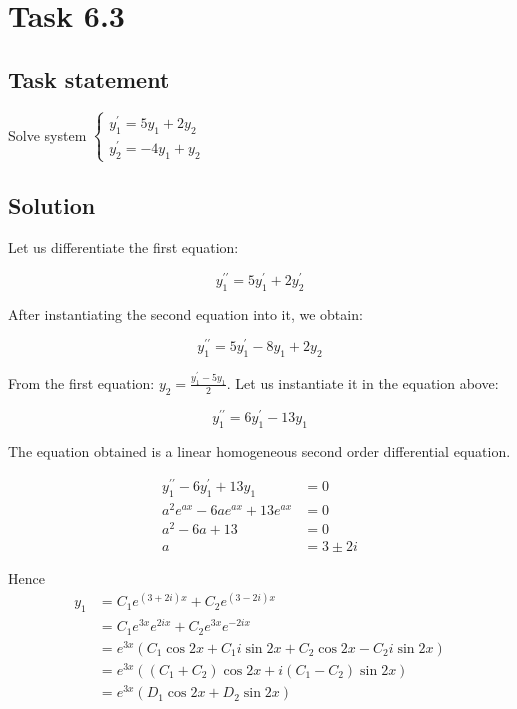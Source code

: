 \section*{Task 6.3}

\subsection*{Task statement}

Solve system $\begin{cases}
    y_1^{\prime} = 5y_1 + 2y_2 \\
    y_2^{\prime} = -4y_1 + y_2
\end{cases}$

\subsection*{Solution}

Let us differentiate the first equation:

\[y_1^{\prime \prime} = 5y_1^{\prime} + 2y_2^{\prime}\]

After instantiating the second equation into it, we obtain:

\[y_1^{\prime \prime} = 5y_1^{\prime} - 8y_1 + 2y_2\]

From the first equation: $y_2 = \frac{y_1^{\prime} - 5y_1}{2}$. Let us instantiate it in the equation above:

\[y_1^{\prime \prime} = 6y_1^{\prime} - 13y_1\]

The equation obtained is a linear homogeneous second order differential equation.

\begin{displaymath}
    \begin{aligned}
        y_1^{\prime \prime} - 6y_1^{\prime} + 13y_1 & = 0 \\ 
        a^2 e^{ax} - 6a e^{ax} + 13 e^{ax} & = 0 \\
        a^2 - 6a + 13 & = 0 \\
        a & = 3 \pm 2i
    \end{aligned}
\end{displaymath}

Hence 
\begin{displaymath}
    \begin{aligned}
        y_1 & = C_1 e^{(3 + 2i)x} + C_2 e^{(3 - 2i)x} \\
        & = C_1 e^{3x} e^{2ix} + C_2 e^{3x} e^{-2ix} \\
        & = e^{3x} (C_1 \cos{2x} + C_1 i \sin{2x} + C_2 \cos{2x} - C_2 i \sin{2x}) \\
        & = e^{3x} ((C_1 + C_2) \cos{2x} + i(C_1 - C_2) \sin{2x}) \\
        & = e^{3x} (D_1 \cos{2x} + D_2 \sin{2x})
    \end{aligned}
\end{displaymath}

